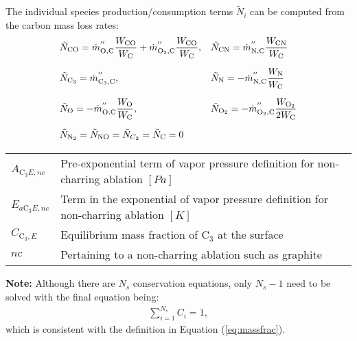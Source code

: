 \documentclass[10pt]{article}
\newcommand{\C}{\text{C}}
\newcommand{\Oo}{\text{O}}
\newcommand{\N}{\text{N}}
\begin{document}
The individual species production/consumption terms $\tilde{N}_i$
can be computed from the carbon mass loss rates:
\begin{equation}
 \begin{array}{ll}
  \tilde{N}_{\C \Oo} = {\dot{m}_{\Oo,\C}}^{''} \dfrac{W_{\C \Oo}}{W_\C} + {\dot{m}_{ \Oo_2,\C}}^{''}\dfrac{W_{\C \Oo}}{W_\C}, &
\tilde{N}_{\C\N} = {\dot{m}_{\N,\C}}^{''} \dfrac{W_{\C\N}}{W_\C} \vspace{10pt}\\
  \tilde{N}_{\C_3} = {\dot{m}_{\C_3,\C}}^{''}, & \tilde{N}_{\N} = - {\dot{m}_{\N,\C}}^{''} \dfrac{W_\N}{W_\C} \vspace{10pt}\\
 \tilde{N}_{ \Oo} = - {\dot{m}_{ \Oo,\C}}^{''} \dfrac{W_ \Oo}{W_\C},& \tilde{N}_{ \Oo_2} = - {\dot{m}_{ \Oo_2,\C}}^{''} \dfrac{W_{ \Oo_2}}{2 W_\C}\vspace{10pt}\\
 \tilde{N}_{\N_2} = \tilde{N}_{\N \Oo} = \tilde{N}_{C_2} = \tilde{N}_{\C} = 0
 \end{array}
\end{equation}

\begin{tabular}{|p{1.5cm} p{12.5cm}|}
\hline
  $ A_{\C_3 E,nc} $ & Pre-exponential term of vapor pressure definition for non-charring ablation $[Pa]$ \\
  $ E_{a\C_3 E,nc} $ & Term in the exponential of vapor pressure definition for non-charring ablation $[K]$ \\
  $C_{{\C_3},E}$ & Equilibrium mass fraction of $\C_3$ at the surface \\
  $ nc $ & Pertaining to a non-charring ablation such as graphite \\
\hline
\end{tabular}

\vspace{12pt}




\vspace{18pt}

\textbf{Note:} Although there are $N_s$ conservation equations, only $N_s-1$ need to be solved with the final equation being:
\begin{align}\label{eq:sum_mass_frac}
\sum_{i=1}^{N_s} C_i = 1 ,
\end{align}
which is consistent with the definition in Equation (\ref{eq:massfrac}).
\end{document}
